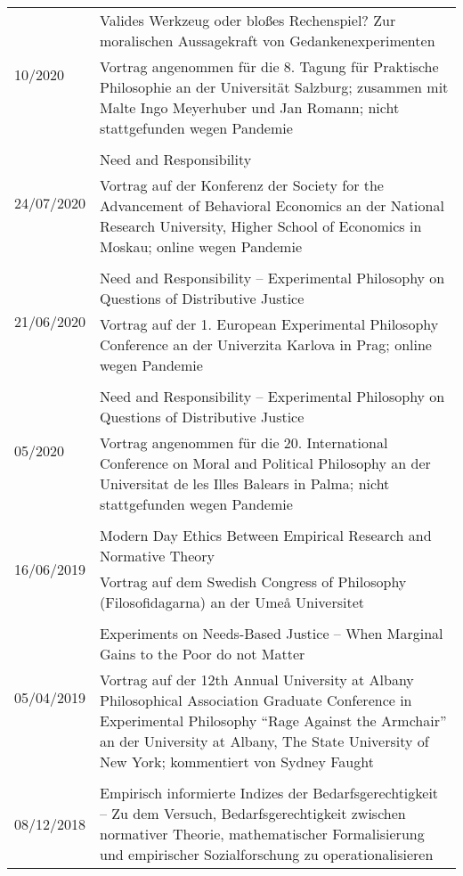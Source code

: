 \documentclass[a4paper,10pt]{article}
\begin{document}
\begin{longtable}{p{}p{}}
\multirow{2}{1,75cm}{\footnotesize{10/2020}} & Valides Werkzeug oder bloßes Rechenspiel? Zur moralischen Aussagekraft von Gedankenexperimenten\\
& \footnotesize{Vortrag angenommen für die 8. Tagung für ​Praktische Philosophie an der Universität Salzburg; zusammen mit Malte Ingo Meyerhuber und Jan Romann; nicht stattgefunden wegen Pandemie}\\
\\
\multirow{2}{1,75cm}{\footnotesize{24/07/2020}} & Need and Responsibility\\
& \footnotesize{Vortrag auf der Konferenz der Society for the Advancement of Behavioral Economics an der National Research University, Higher School of Economics in Moskau; online wegen Pandemie}\\
\\
\multirow{2}{1,75cm}{\footnotesize{21/06/2020}} & Need and Responsibility -- Experimental Philosophy on Questions of Distributive Justice\\
& \footnotesize{Vortrag auf der 1. European Experimental Philosophy Conference an der Univerzita Karlova in Prag; online wegen Pandemie}\\
\\
\multirow{2}{1,75cm}{\footnotesize{05/2020}} & Need and Responsibility -- Experimental Philosophy on Questions of Distributive Justice\\
& \footnotesize{Vortrag angenommen für die 20. International Conference on Moral and Political Philosophy an der Universitat de les Illes Balears in Palma; nicht stattgefunden wegen Pandemie}\\
\\
\multirow{2}{1,75cm}{\footnotesize{16/06/2019}} & Modern Day Ethics Between Empirical Research and Normative Theory\\
& \footnotesize{Vortrag auf dem Swedish Congress of Philosophy (Filosofidagarna) an der Umeå Universitet}\\
\\
\multirow{2}{1,75cm}{\footnotesize{05/04/2019}} & Experiments on Needs-Based Justice -- When Marginal Gains to the Poor do not Matter\\
& \footnotesize{Vortrag auf der 12th Annual University at Albany Philosophical Association Graduate Conference in Experimental Philosophy \enquote{Rage Against the Armchair} an der University at Albany, The State University of New York; kommentiert von Sydney Faught}\\
\\
\multirow{2}{1,75cm}{\footnotesize{08/12/2018}} & Empirisch informierte Indizes der Bedarfsgerechtigkeit -- Zu dem Versuch, Bedarfsgerechtigkeit zwischen normativer Theorie, mathematischer Formalisierung und empirischer Sozialforschung zu operationalisieren\\

\end{longtable}
\end{document}

